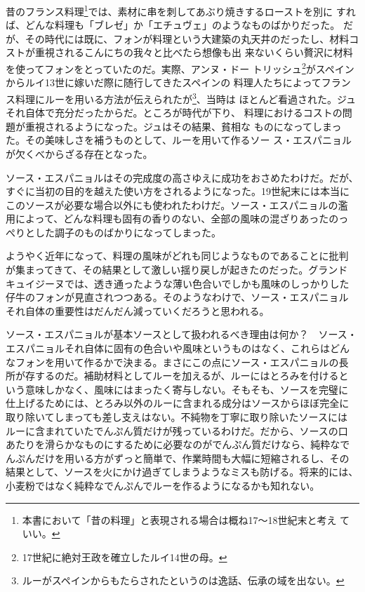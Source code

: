 昔のフランス料理\footnote{本書において「昔の料理」と表現される場合は概ね17〜18世紀末と考え
  ていい。}では、素材に串を刺してあぶり焼きするローストを別に
すれば、どんな料理も「ブレゼ」か「エチュヴェ」のようなものばかりだった。
だが、その時代には既に、フォンが料理という大建築の丸天井のだったし、材料コストが重視されるこんにちの我々と比べたら想像も出
来ないくらい贅沢に材料を使ってフォンをとっていたのだ。実際、アンヌ・ドー
トリッシュ\footnote{17世紀に絶対王政を確立したルイ14世の母。}がスペインからルイ13世に嫁いだ際に随行してきたスペインの
料理人たちによってフランス料理にルーを用いる方法が伝えられたが\footnote{ルーがスペインからもたらされたというのは逸話、伝承の域を出ない。}、当時は
ほとんど看過された。ジュそれ自体で充分だったからだ。ところが時代が下り、
料理におけるコストの問題が重視されるようになった。ジュはその結果、貧相な
ものになってしまった。その美味しさを補うものとして、ルーを用いて作るソー
ス・エスパニョルが欠くべからざる存在となった。

ソース・エスパニョルはその完成度の高さゆえに成功をおさめたわけだ。だが、
すぐに当初の目的を越えた使い方をされるようになった。19世紀末には本当に
このソースが必要な場合以外にも使われたわけだ。ソース・エスパニョルの濫
用によって、どんな料理も固有の香りのない、全部の風味の混ざりあったのっ
ぺりとした調子のものばかりになってしまった。

ようやく近年になって、料理の風味がどれも同じようなものであることに批判
が集まってきて、その結果として激しい揺り戻しが起きたのだった。グランド
キュイジーヌでは、透き通ったような薄い色合いでしかも風味のしっかりした
仔牛のフォンが見直されつつある。そのようなわけで、ソース・エスパニョル
それ自体の重要性はだんだん減っていくだろうと思われる。

ソース・エスパニョルが基本ソースとして扱われるべき理由は何か？　ソース・
エスパニョルそれ自体に固有の色合いや風味というものはなく、これらはどん
なフォンを用いて作るかで決まる。まさにこの点にソース・エスパニョルの長
所が存するのだ。補助材料としてルーを加えるが、ルーにはとろみを付けると
いう意味しかなく、風味にはまったく寄与しない。そもそも、ソースを完璧に
仕上げるためには、とろみ以外のルーに含まれる成分はソースからほぼ完全に
取り除いてしまっても差し支えはない。不純物を丁寧に取り除いたソースには
ルーに含まれていたでんぷん質だけが残っているわけだ。だから、ソースの口
あたりを滑らかなものにするために必要なのがでんぷん質だけなら、純粋なで
んぷんだけを用いる方がずっと簡単で、作業時間も大幅に短縮されるし、その
結果として、ソースを火にかけ過ぎてしまうようなミスも防げる。将来的には、
小麦粉ではなく純粋なでんぷんでルーを作るようになるかも知れない。

